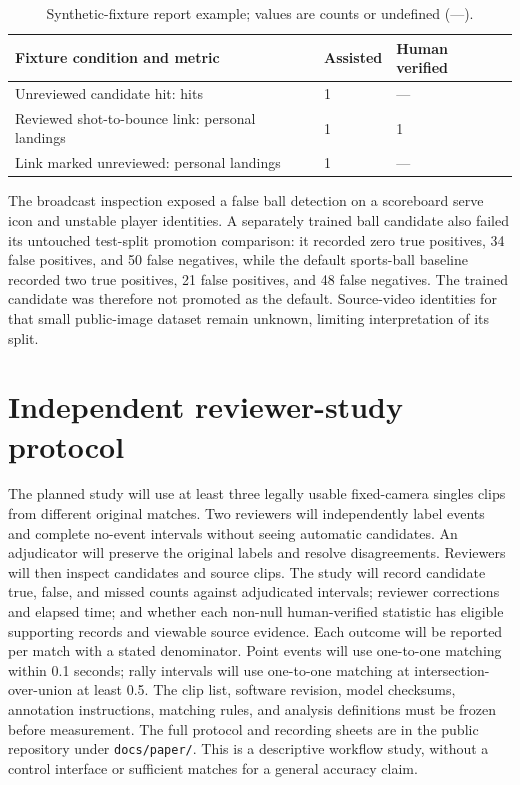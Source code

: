 \documentclass[10pt]{article}
\begin{document}
\begin{table}[h]
\centering
\caption{Synthetic-fixture report example; values are counts or undefined (---).}
\label{tab:fixture}
\begin{tabular}{lll}
\toprule
Fixture condition and metric & Assisted & Human verified \\
\midrule
Unreviewed candidate hit: hits & 1 & --- \\
Reviewed shot-to-bounce link: personal landings & 1 & 1 \\
Link marked unreviewed: personal landings & 1 & --- \\
\bottomrule
\end{tabular}
\end{table}

The broadcast inspection exposed a false ball detection on a scoreboard serve icon and unstable player identities. A separately trained ball candidate also failed its untouched test-split promotion comparison: it recorded zero true positives, 34 false positives, and 50 false negatives, while the default sports-ball baseline recorded two true positives, 21 false positives, and 48 false negatives. The trained candidate was therefore not promoted as the default. Source-video identities for that small public-image dataset remain unknown, limiting interpretation of its split.

\section{Independent reviewer-study protocol}
The planned study will use at least three legally usable fixed-camera singles clips from different original matches. Two reviewers will independently label events and complete no-event intervals without seeing automatic candidates. An adjudicator will preserve the original labels and resolve disagreements. Reviewers will then inspect candidates and source clips. The study will record candidate true, false, and missed counts against adjudicated intervals; reviewer corrections and elapsed time; and whether each non-null human-verified statistic has eligible supporting records and viewable source evidence. Each outcome will be reported per match with a stated denominator. Point events will use one-to-one matching within 0.1 seconds; rally intervals will use one-to-one matching at intersection-over-union at least 0.5. The clip list, software revision, model checksums, annotation instructions, matching rules, and analysis definitions must be frozen before measurement. The full protocol and recording sheets are in the public repository under \texttt{docs/paper/}. This is a descriptive workflow study, without a control interface or sufficient matches for a general accuracy claim.
\end{document}
